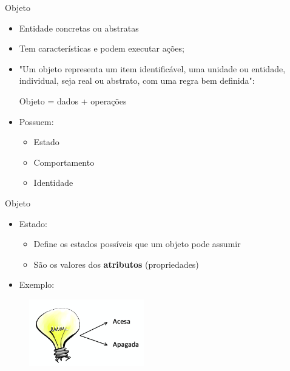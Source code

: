 \documentclass{beamer}
\begin{document}
\begin{frame}{Objeto}
    \begin{itemize}
        \item Entidade concretas ou abstratas
        \item Tem características e podem executar ações;
        \item "Um objeto representa um item identificável, uma unidade ou entidade, individual, seja real ou abstrato, com uma regra bem definida":
        \begin{block}{}
            Objeto = dados + operações
        \end{block}
        \item Possuem:
        \begin{itemize}
            \item Estado
            \item Comportamento
            \item Identidade
        \end{itemize}
    \end{itemize}
\end{frame}

\begin{frame}{Objeto}
    \begin{itemize}
        \item Estado:
        \begin{itemize}
            \item Define os estados possíveis que um objeto pode assumir
            \item São os valores dos \textbf{atributos} (propriedades)
        \end{itemize}
        \item Exemplo:
    \end{itemize}
    \begin{figure}[H]
        \includegraphics[width=5cm]{Theme/Logos/estado_lampada.png}
    \end{figure}
\end{frame}
\end{document}
